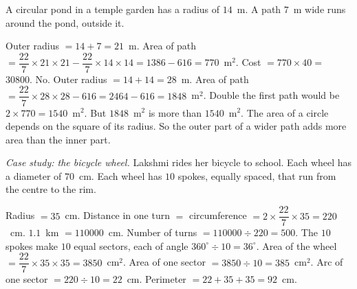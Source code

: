 
\ques A circular pond in a temple garden has a radius of $14$~m. A path $7$~m wide runs around the pond, outside it.\par
{}
\begin{answerblock}
 Outer radius $=14+7=21$~m.\nl
Area of path $=\dfrac{22}{7}\times21\times21-\dfrac{22}{7}\times14\times14=1386-616=770$~m$^2$.
 Cost $=770\times40=$ \rupee\,$30800$.
 No. Outer radius $=14+14=28$~m.\nl
Area of path $=\dfrac{22}{7}\times28\times28-616=2464-616=1848$~m$^2$.\nl
Double the first path would be $2\times770=1540$~m$^2$. But $1848$~m$^2$ is more than $1540$~m$^2$.\nl
The area of a circle depends on the square of its radius. So the outer part of a wider path adds more area than the inner part.
\end{answerblock}


\ques \textit{Case study: the bicycle wheel.} Lakshmi rides her bicycle to school. Each wheel has a diameter of $70$~cm. Each wheel has $10$ spokes, equally spaced, that run from the centre to the rim.\par
\nopagebreak
{}
\orline
{}
\begin{answerblock}
 Radius $=35$~cm. Distance in one turn $=$ circumference $=2\times\dfrac{22}{7}\times35=220$~cm.
 $1.1$~km $=110000$~cm. Number of turns $=110000\div220=500$.
 The $10$ spokes make $10$ equal sectors, each of angle $360^\circ\div10=36^\circ$.\nl
Area of the wheel $=\dfrac{22}{7}\times35\times35=3850$~cm$^2$. Area of one sector $=3850\div10=385$~cm$^2$.
\orline
{} Arc of one sector $=220\div10=22$~cm. Perimeter $=22+35+35=92$~cm.
\end{answerblock}
